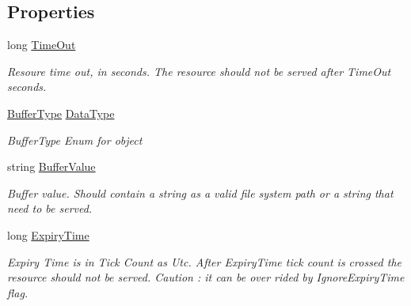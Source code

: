 \subsection*{Properties}
\begin{DoxyCompactItemize}
\item 
long \mbox{\hyperlink{class_concord_1_1_c3_http_module_1_1_http_response_buffer_adf6f6e182181150ba1dd0c67c15483a0}{Time\+Out}}
\begin{DoxyCompactList}\small\item\em Resoure time out, in seconds. The resource should not be served after Time\+Out seconds. \end{DoxyCompactList}\item 
\mbox{\hyperlink{class_concord_1_1_c3_http_module_1_1_http_response_buffer_a34a310395d4f4472b24cf6da3fc3ab82}{Buffer\+Type}} \mbox{\hyperlink{class_concord_1_1_c3_http_module_1_1_http_response_buffer_a2c662375fd85223005a1a955806d832b}{Data\+Type}}
\begin{DoxyCompactList}\small\item\em Buffer\+Type Enum for object \end{DoxyCompactList}\item 
string \mbox{\hyperlink{class_concord_1_1_c3_http_module_1_1_http_response_buffer_af06698528b8ad5326df06a60943da425}{Buffer\+Value}}
\begin{DoxyCompactList}\small\item\em Buffer value. Should contain a string as a valid file system path or a string that need to be served. \end{DoxyCompactList}\item 
long \mbox{\hyperlink{class_concord_1_1_c3_http_module_1_1_http_response_buffer_a9f539228b0303a39989352b90fd3988b}{Expiry\+Time}}
\begin{DoxyCompactList}\small\item\em Expiry Time is in Tick Count as Utc. After Expiry\+Time tick count is crossed the resource should not be served. Caution \+: it can be over rided by Ignore\+Expiry\+Time flag. \end{DoxyCompactList}\item 

\end{DoxyCompactItemize}
